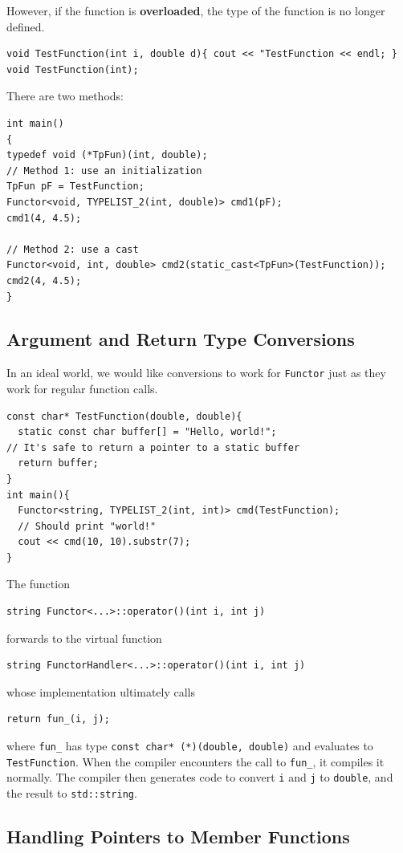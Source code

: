 However, if the function is \textbf{overloaded}, the type of the function is no
longer defined.
\begin{verbatim}
void TestFunction(int i, double d){ cout << "TestFunction << endl; }
void TestFunction(int);
\end{verbatim}

There are two methods:
\begin{verbatim}
int main()
{
typedef void (*TpFun)(int, double);
// Method 1: use an initialization
TpFun pF = TestFunction;
Functor<void, TYPELIST_2(int, double)> cmd1(pF);
cmd1(4, 4.5);

// Method 2: use a cast
Functor<void, int, double> cmd2(static_cast<TpFun>(TestFunction));
cmd2(4, 4.5);
}
\end{verbatim}

\subsection{Argument and Return Type Conversions}

In an ideal world, we would like conversions to work for \texttt{Functor} just
as they work for regular function calls. 
\begin{verbatim}
const char* TestFunction(double, double){
  static const char buffer[] = "Hello, world!";
// It's safe to return a pointer to a static buffer
  return buffer;
}
int main(){
  Functor<string, TYPELIST_2(int, int)> cmd(TestFunction);
  // Should print "world!"
  cout << cmd(10, 10).substr(7);
}
\end{verbatim}

The function
\begin{verbatim}
string Functor<...>::operator()(int i, int j)
\end{verbatim}
forwards to the virtual function
\begin{verbatim}
string FunctorHandler<...>::operator()(int i, int j)
\end{verbatim}
whose implementation ultimately calls
\begin{verbatim}
return fun_(i, j);
\end{verbatim}
where \texttt{fun\_} has type \texttt{const char* (*)(double, double)}
and evaluates to \texttt{TestFunction}. When the compiler encounters
the call to \texttt{fun\_}, it compiles it normally. The compiler then
generates code to convert \texttt{i} and \texttt{j} to
\texttt{double}, and the result to \texttt{std::string}.

\subsection{Handling Pointers to Member Functions}

